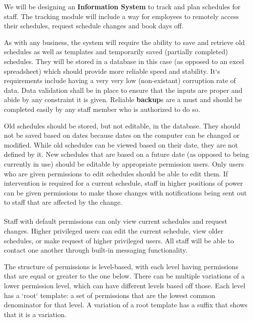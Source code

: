 \documentclass[letterpaper,12pt]{report}
\begin{document}
We will be designing an \textbf{Information System} to track and plan schedules for staff. The tracking module will include a way for employees to remotely access their schedules, request schedule changes and book days off.

As with any business, the system will require the ability to save and retrieve old schedules as well as templates and temporarily saved (partially completed) schedules. They will be stored in a database in this case (as opposed to an excel spreadsheet) which should provide more reliable speed and stability. It`s requirements include having a very very low (non-existant) corruption rate of data. Data validation shall be in place to ensure that the inputs are proper and abide by any constraint it is given. Reliable \textbf{backup}s are a must and should be completed easily by any staff member who is authorized to do so.

Old schedules should be stored, but not editable, in the database. They should not be saved based on dates because dates on the computer can be changed or modified. While old schedules can be viewed based on their date, they are not defined by it. New schedules that are based on a future date (as opposed to being currently in use) should be editable by appropriate permission users. Only users who are given permissions to edit schedules should be able to edit them. If intervention is required for a current schedule, staff in higher positions of power can be given permissions to make those changes with notifications being sent out to staff that are affected by the change.
\pagebreak
\paragraph*{}\hspace{0.6cm}Staff with default permissions can only view current schedules and request changes. Higher privileged users can edit the current schedule, view older schedules, or make request of higher privileged users. All staff will be able to contact one another through built-in messaging functionality.

The structure of permissions is level-based, with each level having permissions that are equal or greater to the one below. There can be multiple variations of a lower permission level, which can have different levels based off those. Each level has a `root` template: a set of permissions that are the lowest common denominator for that level. A variation of a root template has a suffix that shows that it is a variation.\newline 
\end{document}
